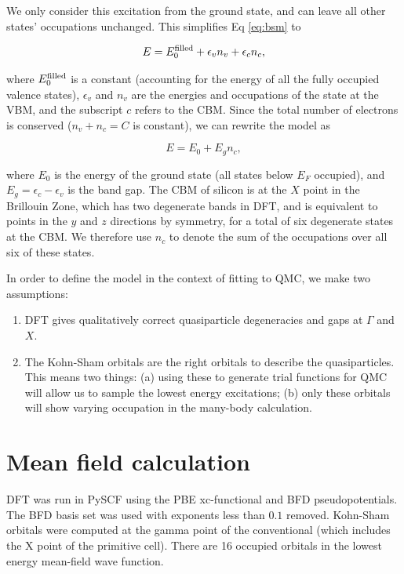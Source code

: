 We only consider this excitation from the ground state, and can leave all other states' occupations unchanged.
This simplifies Eq \ref{eq:bsm} to

\begin{equation}
E = E_0^{\rm filled} + \epsilon_v n_v + \epsilon_c n_c,
\end{equation}

where $E_0^{\rm filled}$ is a constant (accounting for the energy of all the fully occupied valence states), $\epsilon_v$ and $n_v$ are the energies and occupations of the state at the VBM, and the subscript $c$ refers to the CBM.
Since the total number of electrons is conserved ($n_v + n_c = C$ is constant), we can rewrite the model as

\begin{equation}\label{eq:bandgapmodel}
E = E_0 + E_g n_c,
\end{equation}

where $E_0$ is the energy of the ground state (all states below $E_F$ occupied), and $E_g = \epsilon_c - \epsilon_v$ is the band gap.
The CBM of silicon is at the $X$ point in the Brillouin Zone, which has two degenerate bands in DFT, and is equivalent to points in the $y$ and $z$ directions by symmetry, for a total of six degenerate states at the CBM.
We therefore use $n_c$ to denote the sum of the occupations over all six of these states.

In order to define the model in the context of fitting to QMC, we make two assumptions:

\begin{enumerate}
\item DFT gives qualitatively correct quasiparticle degeneracies and gaps at $\Gamma$ and $X$.
\item The Kohn-Sham orbitals are the right orbitals to describe the quasiparticles.
This means two things: 
(a) using these to generate trial functions for QMC will allow us to sample the lowest energy excitations; 
(b) only these orbitals will show varying occupation in the many-body calculation.
\end{enumerate}

\section{Mean field calculation}

DFT was run in PySCF using the PBE xc-functional and BFD pseudopotentials.
The BFD basis set was used with exponents less than $0.1$ removed.
Kohn-Sham orbitals were computed at the gamma point of the conventional (which includes the X point of the primitive cell).
There are 16 occupied orbitals in the lowest energy mean-field wave function.



